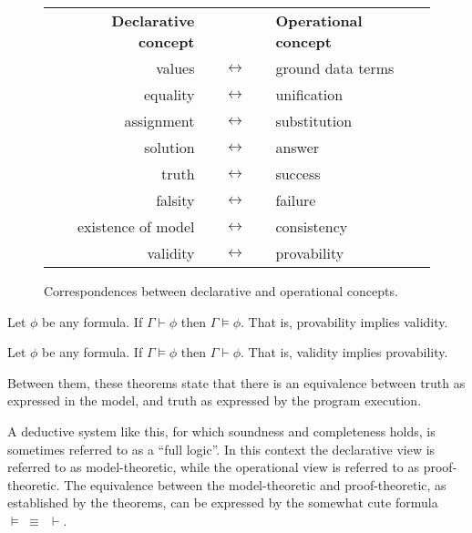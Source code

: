 \begin{figure}
\begin{center}
\begin{tabular}{rcl}
\bf{Declarative concept} & & \bf{Operational concept} \\[1em]
values & $\quad\longleftrightarrow\quad$ & ground data terms \\
equality & $\quad\longleftrightarrow\quad$ & unification \\
assignment & $\quad\longleftrightarrow\quad$ & substitution \\
solution & $\quad\longleftrightarrow\quad$ & answer \\
truth & $\quad\longleftrightarrow\quad$ & success \\
falsity & $\quad\longleftrightarrow\quad$ & failure \\
existence of model & $\quad\longleftrightarrow\quad$ & consistency \\
validity & $\quad\longleftrightarrow\quad$ & provability
\end{tabular}
\end{center}
\caption{
Correspondences between declarative and operational concepts.
\label{fig:correspondence}
}
\end{figure}

\begin{theorem}[Soundness] \label{thm:soundness}
Let $\phi$ be any formula.
If\: $\Gamma \vdash \phi$ then $\Gamma \models \phi$.
That is, provability implies validity.
\end{theorem}

\begin{theorem}[Completeness] \label{thm:completeness}
Let $\phi$ be any formula.
If\: $\Gamma \models \phi$ then $\Gamma \vdash \phi$.
That is, validity implies provability.
\end{theorem}

\noindent
Between them,
these theorems state that there is an equivalence between
truth as expressed in the model,
and truth as expressed by the program execution.

A deductive system like this,
for which soundness and completeness holds,
is sometimes referred to as a ``full logic\label{gi:full-logic}''.
In this context the declarative view
is referred to as model-theoretic,
while the operational view
is referred to as proof-theoretic.
The equivalence between the model-theoretic and proof-theoretic,
as established by the theorems,
can be expressed by the somewhat cute formula
$\models\; \equiv\;\, \vdash$.

